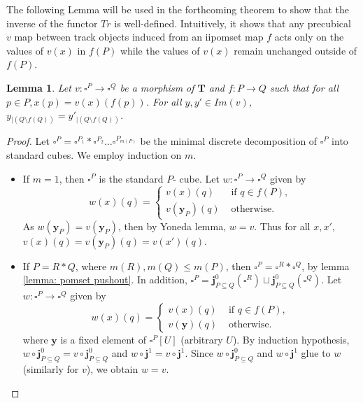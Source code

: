 \documentclass[11pt,a4paper,oldfontcommands]{memoir}
\newcommand{\TrO}{\mathbf{T}}
\newcommand*\rest[1]{{}_{| #1}}
\newcommand*\jneda{\mathbf{j}}
\newtheorem{lemma}[definition]{Lemma}
\begin{document}
The following Lemma will be used in the forthcoming theorem to show that the inverse of the functor $Tr$ is well-defined. Intuitively, it shows that any precubical $v$ map between track objects induced from an iipomset map $f$ acts only on the values of $v(x)$ in $f(P)$ while the values of $v(x)$ remain unchanged outside of $f(P)$.
\begin{lemma}\label{lemma: varepsilon well defined}
    Let $v: \square^P \to \square^Q$ be a morphism of $\TrO$ and $f: P \to Q$ such that for all $p\in P,x(p)=v(x)(f(p)) $. For all $y,y' \in Im(v)$, $y\rest{(Q \setminus f(Q))}=y'\rest{(Q \setminus f(Q))}$.
\end{lemma}
\begin{proof}
    Let $\square^P=\square^{P_1}*\square^{P_2} \dots\square^{P_{m(P)}}$ be the minimal discrete decomposition of $\square^{P}$ into standard cubes. We employ induction on $m$.
    \begin{itemize}
        \item If $m=1$, then $\square^{P}$ is the standard $P$- cube. Let $w: \square^P \to \square^Q$ given by 
         $$w(x)(q)= \begin{cases} v(x)(q) &   \text { if } q \in f(P), \\ v(\mathbf{y}_P)(q) & \text { otherwise. } \end{cases}
$$
As $w(\mathbf{y}_P)=v(\mathbf{y}_P)$, then by Yoneda lemma, $w=v$. Thus for all $x,x',$\linebreak$v(x)(q)=v(\mathbf{y}_P)(q)=v(x')(q).$ 
\item If $P=R*Q$, where $m(R),m(Q) \leq  m(P)$, then $\square^P=\square^R*\square^Q$, by lemma \ref{lemma: pomset pushout}. In addition, $\square^P=\jneda^0_{P \subseteq Q}(\square^R) \sqcup \jneda^0_{P \subseteq Q}(\square^Q)$. Let $w: \square^P \to \square^Q$ given by 
  $$w(x)(q)= \begin{cases} v(x)(q) &   \text { if } q \in f(P), \\ v(\mathbf{y})(q) & \text { otherwise. } \end{cases}$$
  where $\mathbf{y}$ is a fixed element of $\square^P[U]$ (arbitrary $U$). By induction hypothesis, $w\circ \jneda^0_{P \subseteq Q}=v\circ \jneda^0_{P \subseteq Q}$ and  $w\circ \jneda^1=v\circ \jneda^1$. Since $w\circ \jneda^0_{P \subseteq Q}$ and $w\circ \jneda^1$ glue to $w$ (similarly for $v$), we obtain $w=v$.
    \end{itemize}
\end{proof}
\end{document}
